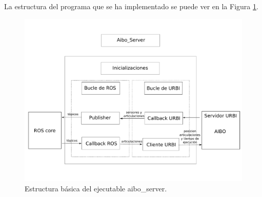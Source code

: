 \documentclass[12pt,a4paper,final,twoside]{article}
\begin{document}
La estructura del programa que se ha implementado se puede ver en la Figura \ref{fig:aiboserver}.
\begin{figure}[H]
	\centering
    \includegraphics[scale=0.35]{images/Aibo_Server.pdf}
	 \caption{Estructura básica del ejecutable aibo{\_}server.}
  \label{fig:aiboserver}
\end{figure}
\end{document}
